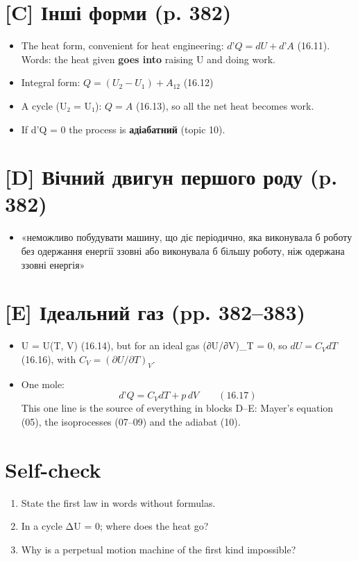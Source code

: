 \documentclass[11pt,a4paper,oneside]{book}
\begin{document}
\section*{[C] Інші форми (p. 382)}
\begin{itemize}
\item The heat form, convenient for heat engineering: $d\text{'}Q = dU + d\text{'}A$ (16.11). Words: the heat given \textbf{goes into} raising U and doing work.
\item Integral form: $Q = (U_2 - U_1) + A_{12}$ (16.12)
\item A cycle (U₂ = U₁): $Q = A$ (16.13), so all the net heat becomes work.
\item If d'Q = 0 the process is \textbf{адіабатний} (topic 10).
\end{itemize}

\section*{[D] Вічний двигун першого роду (p. 382)}
\begin{itemize}
\item «неможливо побудувати машину, що діє періодично, яка виконувала б роботу без одержання енергії ззовні або виконувала б більшу роботу, ніж одержана ззовні енергія»
\end{itemize}

\section*{[E] Ідеальний газ (pp. 382–383)}
\begin{itemize}
\item U = U(T, V) (16.14), but for an ideal gas (∂U/∂V)\_T = 0, so $dU = C_VdT$ (16.16), with $C_V = (\partial U/\partial T)_V$.
\item One mole:
\[d\text{'}Q = C_VdT + p\,dV\qquad(16.17)\]
This one line is the source of everything in blocks D–E: Mayer's equation (05), the isoprocesses (07–09) and the adiabat (10).
\end{itemize}

\section*{Self-check}
\begin{enumerate}
\item State the first law in words without formulas.
\item In a cycle ΔU = 0; where does the heat go?
\item Why is a perpetual motion machine of the first kind impossible?
\end{enumerate}
\end{document}
